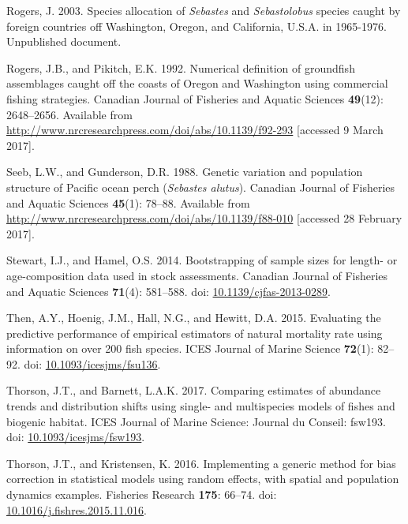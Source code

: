 \documentclass[12pt,]{article}
\begin{document}
\hypertarget{ref-rogers_species_2003}{}
Rogers, J. 2003. Species allocation of \emph{Sebastes} and
\emph{Sebastolobus} species caught by foreign countries off Washington,
Oregon, and California, U.S.A. in 1965-1976. Unpublished document.

\hypertarget{ref-rogers_numerical_1992}{}
Rogers, J.B., and Pikitch, E.K. 1992. Numerical definition of groundfish
assemblages caught off the coasts of Oregon and Washington using
commercial fishing strategies. Canadian Journal of Fisheries and Aquatic
Sciences \textbf{49}(12): 2648--2656. Available from
\url{http://www.nrcresearchpress.com/doi/abs/10.1139/f92-293}
{[}accessed 9 March 2017{]}.

\hypertarget{ref-seeb_genetic_1988}{}
Seeb, L.W., and Gunderson, D.R. 1988. Genetic variation and population
structure of Pacific ocean perch (\emph{Sebastes alutus}). Canadian
Journal of Fisheries and Aquatic Sciences \textbf{45}(1): 78--88.
Available from
\url{http://www.nrcresearchpress.com/doi/abs/10.1139/f88-010}
{[}accessed 28 February 2017{]}.

\hypertarget{ref-stewart_bootstrapping_2014}{}
Stewart, I.J., and Hamel, O.S. 2014. Bootstrapping of sample sizes for
length- or age-composition data used in stock assessments. Canadian
Journal of Fisheries and Aquatic Sciences \textbf{71}(4): 581--588. doi:
\href{https://doi.org/10.1139/cjfas-2013-0289}{10.1139/cjfas-2013-0289}.

\hypertarget{ref-then_evaluating_2015}{}
Then, A.Y., Hoenig, J.M., Hall, N.G., and Hewitt, D.A. 2015. Evaluating
the predictive performance of empirical estimators of natural mortality
rate using information on over 200 fish species. ICES Journal of Marine
Science \textbf{72}(1): 82--92. doi:
\href{https://doi.org/10.1093/icesjms/fsu136}{10.1093/icesjms/fsu136}.

\hypertarget{ref-thorson_comparing_2017}{}
Thorson, J.T., and Barnett, L.A.K. 2017. Comparing estimates of
abundance trends and distribution shifts using single- and multispecies
models of fishes and biogenic habitat. ICES Journal of Marine Science:
Journal du Conseil: fsw193. doi:
\href{https://doi.org/10.1093/icesjms/fsw193}{10.1093/icesjms/fsw193}.

\hypertarget{ref-thorson_implementing_2016}{}
Thorson, J.T., and Kristensen, K. 2016. Implementing a generic method
for bias correction in statistical models using random effects, with
spatial and population dynamics examples. Fisheries Research
\textbf{175}: 66--74. doi:
\href{https://doi.org/10.1016/j.fishres.2015.11.016}{10.1016/j.fishres.2015.11.016}.
\end{document}
